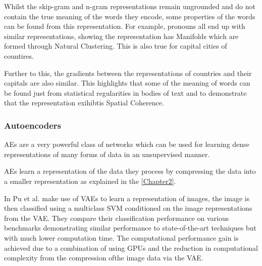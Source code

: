 Whilst the skip-gram and n-gram representations remain ungrounded and do not contain the true meaning of the words they encode, some properties of the words can be found from this representation. For example, pronouns all end up with similar representations, showing the representation has Manifolds which are formed through Natural Clustering. This is also true for capital cities of countires. 

Further to this, the gradients between the representations of countries and their capitals are also similar. This highlights that some of the meaning of words can be found just from statistical regularities in bodies of text and to demonstrate that the representation exihibtis Spatial Coherence.


\subsubsection{Autoencoders}
\ac{AE}s are a very powerful class of networks which can be used for learning dense representations of many forms of data in an unsupervised manner.

\ac{AE}s learn a representation of the data they process by compressing the data into a smaller representation as explained in the \ref{Chapter2}.

In \cite{pu2016variational} Pu et al. make use of \ac{VAE}s to learn a representation of images, the image is then classified using a multiclass \ac{SVM} conditioned on the image representations from the \ac{VAE}. They compare their classification performance on various benchmarks demonstrating similar performance to state-of-the-art techniques but with much lower computation time. The computational performance gain is achieved due to a combination of using \ac{GPU}s and the reduction in computational complexity from the compression ofthe image data via the \ac{VAE}.

